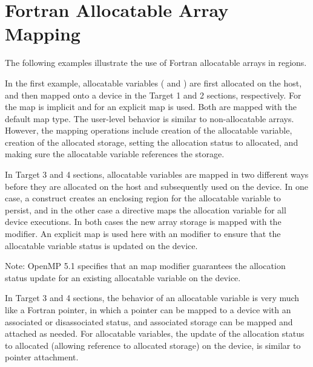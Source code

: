 \section{Fortran Allocatable Array Mapping}
\label{sec:fort_allocatable_array_mapping}


The following examples illustrate the use of Fortran allocatable arrays in  regions.

In the first example, allocatable variables ( and ) are first allocated
on the host, and then mapped onto a device in the Target 1 and 2 sections, respectively.
For  the map is implicit and for  an explicit map is used.
Both are mapped with the default  map type.
The user-level behavior is similar to non-allocatable arrays.
However, the mapping operations include creation of the allocatable variable,
creation of the allocated storage, setting the allocation status to allocated,
and making sure the allocatable variable references the storage.

In Target 3 and 4 sections, allocatable variables are mapped in two
different ways before they are allocated on the host and subsequently used on the device.
In one case, a  construct creates an enclosing region for
the allocatable variable to persist, and in the other case a
 directive maps the allocation variable for all device executions.
In both cases the new array storage is mapped  with the  modifier.
An explicit map is used here with an  modifier to ensure that the allocatable
variable status is updated on the device.

Note: OpenMP 5.1 specifies that an  map modifier guarantees the
allocation status update for an existing allocatable variable on the device.

In Target 3 and 4 sections, the behavior of an allocatable variable is very
much like a Fortran pointer, in which a pointer can be mapped to a device with an associated
or disassociated status, and associated storage can be mapped and attached as needed.
For allocatable variables, the update of the allocation status to allocated (allowing
reference to allocated storage) on the device, is similar to pointer attachment.


